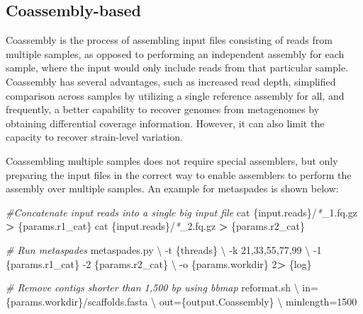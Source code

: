 \documentclass[
]{book}
\newenvironment{Shaded}{\begin{snugshade}}{\end{snugshade}}
\newcommand{\AttributeTok}[1]{\textcolor[rgb]{0.77,0.63,0.00}{#1}}
\newcommand{\CommentTok}[1]{\textcolor[rgb]{0.56,0.35,0.01}{\textit{#1}}}
\newcommand{\DataTypeTok}[1]{\textcolor[rgb]{0.13,0.29,0.53}{#1}}
\newcommand{\DecValTok}[1]{\textcolor[rgb]{0.00,0.00,0.81}{#1}}
\newcommand{\ExtensionTok}[1]{#1}
\newcommand{\FunctionTok}[1]{\textcolor[rgb]{0.00,0.00,0.00}{#1}}
\newcommand{\NormalTok}[1]{#1}
\newcommand{\OperatorTok}[1]{\textcolor[rgb]{0.81,0.36,0.00}{\textbf{#1}}}
\newcommand{\PreprocessorTok}[1]{\textcolor[rgb]{0.56,0.35,0.01}{\textit{#1}}}
\begin{document}
\normalsize

\hypertarget{coassembly-based}{%
\subsection*{Coassembly-based}\label{coassembly-based}}

Coassembly is the process of assembling input files consisting of reads from multiple samples, as opposed to performing an independent assembly for each sample, where the input would only include reads from that particular sample. Coassembly has several advantages, such as increased read depth, simplified comparison across samples by utilizing a single reference assembly for all, and frequently, a better capability to recover genomes from metagenomes by obtaining differential coverage information. However, it can also limit the capacity to recover strain-level variation.

Coassembling multiple samples does not require special assemblers, but only preparing the input files in the correct way to enable assemblers to perform the assembly over multiple samples. An example for metaspades is shown below:

\small

\begin{Shaded}
\begin{Highlighting}[]
\CommentTok{\#Concatenate input reads into a single big input file}
\FunctionTok{cat}\NormalTok{ \{input.reads\}/}\PreprocessorTok{*}\NormalTok{\_1.fq.gz }\OperatorTok{\textgreater{}}\NormalTok{ \{params.r1\_cat\}}
\FunctionTok{cat}\NormalTok{ \{input.reads\}/}\PreprocessorTok{*}\NormalTok{\_2.fq.gz }\OperatorTok{\textgreater{}}\NormalTok{ \{params.r2\_cat\}}

\CommentTok{\# Run metaspades}
\ExtensionTok{metaspades.py} \DataTypeTok{\textbackslash{}}
    \AttributeTok{{-}t}\NormalTok{ \{threads\} }\DataTypeTok{\textbackslash{}}
    \AttributeTok{{-}k}\NormalTok{ 21,33,55,77,99 }\DataTypeTok{\textbackslash{}}
    \AttributeTok{{-}1}\NormalTok{ \{params.r1\_cat\} }\AttributeTok{{-}2}\NormalTok{ \{params.r2\_cat\} }\DataTypeTok{\textbackslash{}}
    \AttributeTok{{-}o}\NormalTok{ \{params.workdir\}}
    \DecValTok{2}\OperatorTok{\textgreater{}}\NormalTok{ \{log\}}

\CommentTok{\# Remove contigs shorter than 1,500 bp using bbmap}
\ExtensionTok{reformat.sh} \DataTypeTok{\textbackslash{}}
\NormalTok{    in=\{params.workdir\}/scaffolds.fasta }\DataTypeTok{\textbackslash{}}
\NormalTok{    out=\{output.Coassembly\} }\DataTypeTok{\textbackslash{}}
\NormalTok{    minlength=1500}
\end{Highlighting}
\end{Shaded}
\end{document}
